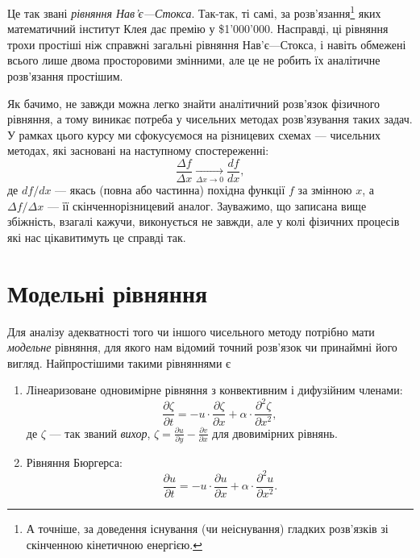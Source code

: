 Це так звані \textit{рівняння Нав'є---Стокса}. Так-так, ті самі, за розв'язання\footnote{А точніше, за доведення існування (чи неіснування) гладких розв'язків зі скінченною кінетичною енергією.} яких математичний інститут Клея дає премію у \$1'000'000. Насправді, ці рівняння трохи простіші ніж справжні загальні рівняння Нав'є---Стокса, і навіть обмежені всього лише двома просторовими змінними, але це не робить їх аналітичне розв'язання простішим. \medskip

Як бачимо, не завжди можна легко знайти аналітичний розв'язок фізичного рівняння, а тому виникає потреба у чисельних методах розв'язування таких задач. У рамках цього курсу ми сфокусуємося на різницевих схемах --- чисельних методах, які засновані на наступному спостереженні:
\begin{equation}
    \frac{\Delta f}{\Delta x} \xrightarrow[\Delta x \to 0]{} \frac{d f}{d x},
\end{equation}
де $df/dx$ --- якась (повна або частинна) похідна функції $f$ за змінною $x$, а $\Delta f/\Delta x$ --- її скінченнорізницевий аналог. Зауважимо, що записана вище збіжність, взагалі кажучи, виконується не завжди, але у колі фізичних процесів які нас цікавитимуть це справді так.

\section{Модельні рівняння}

Для аналізу адекватності того чи іншого чисельного методу потрібно мати \textit{модельне} рівняння, для якого нам відомий точний розв'язок чи принаймні його вигляд. Найпростішими такими рівняннями є
\begin{enumerate}
    \item Лінеаризоване одновимірне рівняння з конвективним і дифузійним членами:
    \begin{equation}
        \frac{\partial \zeta}{\partial t} = -u \cdot \frac{\partial \zeta}{\partial x} + \alpha \cdot \frac{\partial^2 \zeta}{\partial x^2},
    \end{equation}
    де $\zeta$ --- так званий \textit{вихор}, $\zeta = \frac{\partial u}{\partial y} - \frac{\partial v}{\partial x}$ для двовимірних рівнянь.

    \item Рівняння Бюргерса:
    \begin{equation}
        \frac{\partial u}{\partial t} = -u \cdot \frac{\partial u}{\partial x} + \alpha \cdot \frac{\partial^2 u}{\partial x^2}.
    \end{equation}
\end{enumerate}

